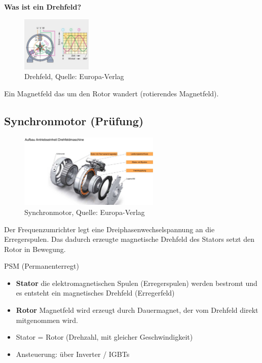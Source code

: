 \newpage

\textbf{Was ist ein Drehfeld?}

\begin{figure}[!ht]%
\centering
\includegraphics[width=0.3\textwidth]{images/HV/HV-9.pdf}
\caption{Drehfeld, Quelle: Europa-Verlag}
\end{figure}

Ein Magnetfeld das um den Rotor wandert (rotierendes Magnetfeld).

\subsection{Synchronmotor (Prüfung)}\label{synchronmotor-pruefung}

\begin{figure}[!ht]%
\centering
\includegraphics[width=0.6\textwidth]{images/HV/HV-6.pdf}
\caption{Synchronmotor, Quelle: Europa-Verlag}
\end{figure}

Der Frequenzumrichter legt eine Dreiphasenwechselspannung an die
Erregerspulen. Das dadurch erzeugte magnetische Drehfeld des Stators
setzt den Rotor in Bewegung.

PSM (Permanenterregt)

\begin{itemize}
\item
  \textbf{Stator} die elektromagnetischen Spulen (Erregerspulen) werden
  bestromt und es entsteht ein magnetisches Drehfeld (Erregerfeld)
\item
  \textbf{Rotor} Magnetfeld wird erzeugt durch Dauermagnet, der vom
  Drehfeld direkt mitgenommen wird.
\item
  Stator = Rotor (Drehzahl, mit gleicher Geschwindigkeit)
\item
  Ansteuerung: über Inverter / IGBTs
\end{itemize}

